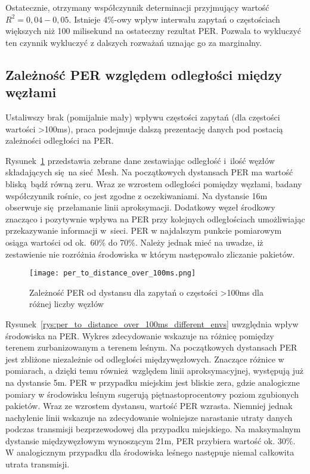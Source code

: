Ostatecznie, otrzymany współczynnik determinacji przyjmujący wartość $R^2=0,04-0,05$.  Istnieje 4\%-owy wpływ
interwału zapytań o częstościach większych niż 100 milisekund na ostateczny rezultat PER. Pozwala to
wykluczyć ten czynnik wykluczyć z dalszych rozważań uznając go za marginalny.

\subsection{Zależność PER względem odległości między węzłami}

Ustaliwszy brak (pomijalnie mały) wpływu częstości zapytań (dla częstości wartości >100ms), praca podejmuje dalszą prezentację
danych pod postacią zależności odległości na PER.

Rysunek~\ref{rys:per_to_distance_over_100ms} przedstawia zebrane dane zestawiając odległość i~ilość węzłów składających
się na sieć Mesh. Na początkowych dystansach PER ma wartość bliską bądź równą zeru. Wraz ze wzrostem odległości pomiędzy
węzłami, badany współczynnik rośnie, co jest zgodne z oczekiwaniami. Na dystansie 16m obserwuje się przełamanie
linii aproksymacji. Dodatkowy węzeł środkowy znacząco i pozytywnie wpływa na PER przy kolejnych odległościach
umożliwiając przekazywanie informacji w~sieci. PER w najdalszym punkcie pomiarowym osiąga wartości od ok.~60\% do 70\%.
Należy jednak mieć na uwadze, iż zestawienie nie rozróżnia środowiska w którym następowało zliczanie pakietów.


\begin{figure}[!htb]
	\centering \texttt{[image: per\_to\_distance\_over\_100ms.png]}
	\caption{Zależność \gls{PER} od dystansu dla zapytań o częstości >100ms dla różnej liczby węzłów}
	\label{rys:per_to_distance_over_100ms}
\end{figure}

Rysunek~\ref{rys:per_to_distance_over_100ms_different_envs} uwzględnia wpływ środowiska na PER. Wykres zdecydowanie
wskazuje na różnicę pomiędzy terenem zurbanizowanym a terenem leśnym. Na początkowych dystansach PER jest zbliżone
niezależnie od odległości międzywęzłowych. Znaczące różnice w pomiarach, a dzięki temu również względem linii aproksymacyjnej,
występują już na dystansie 5m. PER w przypadku miejskim jest bliskie zera, gdzie analogiczne pomiary w środowisku
leśnym sugerują piętnastoprocentowy poziom zgubionych pakietów. Wraz ze wzrostem dystansu, wartość PER wzrasta.
Niemniej jednak nachylenie linii wskazuje na zdecydowanie wolniejsze narastanie utraty danych podczas transmisji
bezprzewodowej dla przypadku miejskiego. Na maksymalnym dystansie międzywęzłowym wynoszącym 21m, PER
przybiera wartość ok. 30\%. W analogicznym przypadku dla środowiska leśnego następuje niemal całkowita utrata
transmisji.

